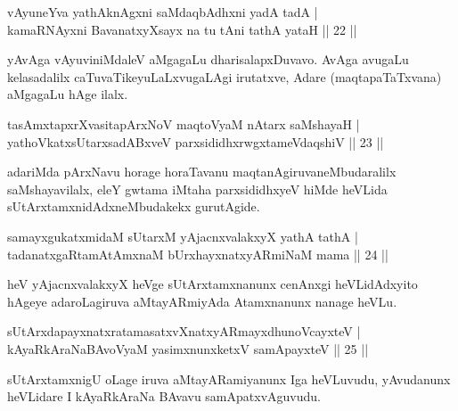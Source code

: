 \begin{shl}
vAyuneYva yathA\s knAgxni saMdaqbAdhxni yadA tadA |\\
kamaRNAyxni BavanatxyXsayx na tu tAni tathA yataH \hfill || 22 ||
\end{shl}

\begin{artha}
yAvAga vAyuviniMdaleV aMgagaLu dharisalapxDuvavo. AvAga avugaLu kelasadalilx caTuvaTikeyuLaLxvugaLAgi irutatxve, Adare (maqtapaTaTxvana) aMgagaLu hAge ilalx.
\end{artha}

\begin{shl}
tasAmxtapxrXvasitapArxNoV maqtoV\s yaM nAtarx saMshayaH |\\
yathoVkatxsUtarxsadABxveV parxsididhxrwgxtameVdaqshiV \hfill || 23 ||
\end{shl}

\begin{artha}%
adariMda pArxNavu horage horaTavanu maqtanAgiruvaneMbudaralilx saMshayavilalx, eleY gwtama iMtaha parxsididhxyeV hiMde heVLida sUtArxtamxnidAdxneMbudakekx gurutAgide.
\end{artha}

\begin{shl}
samayxgukatxmidaM sUtarxM yAjacnxvalakxyX yathA tathA |\\
tadanatxgaRtamAtAmxnaM bUrxhayxnatxyARmiNaM mama \hfill || 24 ||
\end{shl}

\begin{artha}
heV yAjacnxvalakxyX heVge sUtArxtamxnanunx cenAnxgi heVLidAdxyito hAgeye adaroLagiruva aMtayARmiyAda Atamxnanunx nanage heVLu.
\end{artha}


\begin{shl}
sUtArxdapayxnatxratamasatxvXnatxyARmayxdhunoVcayxteV |\\
kAyaRkAraNaBAvoV\s yaM yasimxnunxketxV samApayxteV \hfill || 25 ||
\end{shl}

\begin{artha}
sUtArxtamxnigU oLage iruva aMtayARamiyanunx Iga heVLuvudu, yAvudanunx heVLidare I kAyaRkAraNa BAvavu samApatxvAguvudu.
\end{artha}


